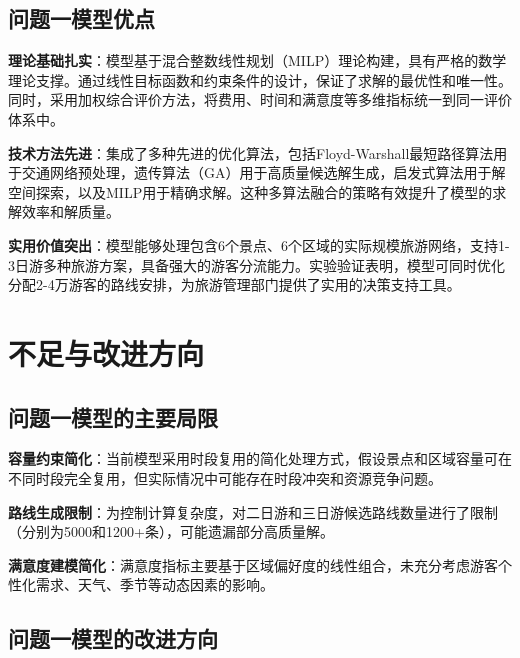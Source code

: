 \subsection[\hspace{-2pt}问题一模型优点]{{\heiti{} \hspace{-8pt}问题一模型优点}}\label{subsection5: 问题一模型优点}

\noindent\textbf{理论基础扎实}：模型基于混合整数线性规划（MILP）理论构建，具有严格的数学理论支撑。通过线性目标函数和约束条件的设计，保证了求解的最优性和唯一性。同时，采用加权综合评价方法，将费用、时间和满意度等多维指标统一到同一评价体系中。

\noindent\textbf{技术方法先进}：集成了多种先进的优化算法，包括Floyd-Warshall最短路径算法用于交通网络预处理，遗传算法（GA）用于高质量候选解生成，启发式算法用于解空间探索，以及MILP用于精确求解。这种多算法融合的策略有效提升了模型的求解效率和解质量。

\noindent\textbf{实用价值突出}：模型能够处理包含6个景点、6个区域的实际规模旅游网络，支持1-3日游多种旅游方案，具备强大的游客分流能力。实验验证表明，模型可同时优化分配2-4万游客的路线安排，为旅游管理部门提供了实用的决策支持工具。

\section[\hspace{-2pt}不足与改进方向]{{\heiti{} \hspace{-8pt}不足与改进方向}}\label{section5: 不足与改进方向}

\subsection[\hspace{-2pt}问题一模型的主要局限]{{\heiti{} \hspace{-8pt}问题一模型的主要局限}}\label{subsection5: 问题一模型局限}

\noindent\textbf{容量约束简化}：当前模型采用时段复用的简化处理方式，假设景点和区域容量可在不同时段完全复用，但实际情况中可能存在时段冲突和资源竞争问题。

\noindent\textbf{路线生成限制}：为控制计算复杂度，对二日游和三日游候选路线数量进行了限制（分别为5000和1200+条），可能遗漏部分高质量解。

\noindent\textbf{满意度建模简化}：满意度指标主要基于区域偏好度的线性组合，未充分考虑游客个性化需求、天气、季节等动态因素的影响。

\subsection[\hspace{-2pt}问题一模型的改进方向]{{\heiti{} \hspace{-8pt}问题一模型的改进方向}}\label{subsection5: 问题一模型改进}

